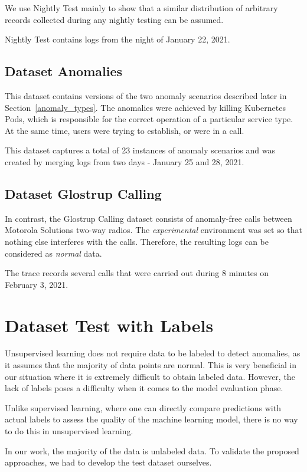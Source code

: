 We use Nightly Test mainly to show that a similar distribution of arbitrary records collected during any nightly testing can be assumed.

Nightly Test contains logs from the night of January 22, 2021.

\subsection{Dataset Anomalies}

This dataset contains versions of the two anomaly scenarios described later in Section~\ref{anomaly_types}. 
The anomalies were achieved by killing Kubernetes Pods, which is responsible for the correct operation of a particular service type. 
At the same time, users were trying to establish, or were in a call.

This dataset captures a total of 23 instances of anomaly scenarios and was created by merging logs from two days - January 25 and 28, 2021.

\subsection{Dataset Glostrup Calling}

In contrast, the Glostrup Calling dataset consists of anomaly-free calls between Motorola Solutions two-way radios. 
The \textit{experimental} environment was set so that nothing else interferes with the calls. Therefore, the resulting logs can be considered as \textit{normal} data.

The trace records several calls that were carried out during 8 minutes on February 3, 2021.

\section{Dataset Test with Labels} 
\label{section:testset}
Unsupervised learning does not require data to be labeled to detect anomalies, as it assumes that the majority of data points are normal.  This is very beneficial in our situation where it is extremely difficult to obtain labeled data. However, the lack of labels poses a difficulty when it comes to the model evaluation phase.

Unlike supervised learning, where one can directly compare predictions with actual labels to assess the quality of the machine learning model, there is no way to do this in unsupervised learning.

In our work, the majority of the data is unlabeled data. To validate the proposed approaches, we had to develop the test dataset ourselves.


